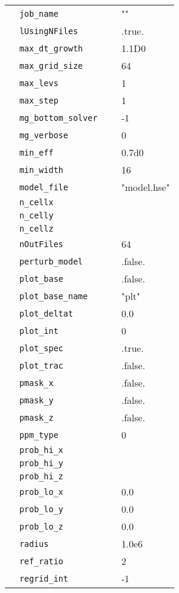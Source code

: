 \begin{center}
\begin{longtable}{|l|p{3.0in}|l|}
\verb=  job_name =  &   & "" \\
\verb=  lUsingNFiles =  &   &  .true.  \\
\verb=  max_dt_growth =  &   &  1.1D0  \\
\verb=  max_grid_size =  &   &  64  \\
\verb=  max_levs =  &   &  1  \\
\verb=  max_step =  &   &  1  \\
\verb=  mg_bottom_solver =  &   &  -1 \\
\verb=  mg_verbose =  &   &  0  \\
\verb=  min_eff =  &   &  0.7d0  \\
\verb=  min_width =  &   &  16  \\
\verb=  model_file =  &   & "model.hse" \\
\verb=  n_cellx =  &   &   \\
\verb=  n_celly =  &   &   \\
\verb=  n_cellz =  &   &   \\
\verb=  nOutFiles =  &   &  64  \\
\verb=  perturb_model =  &   &  .false.  \\
\verb=  plot_base =  &   & .false. \\
\verb=  plot_base_name =  &   & "plt" \\
\verb=  plot_deltat =  &   &  0.0  \\
\verb=  plot_int =  &   &  0  \\
\verb=  plot_spec =  &   &  .true.  \\
\verb=  plot_trac =  &   &  .false.  \\
\verb=  pmask_x =  &   & .false. \\
\verb=  pmask_y =  &   & .false. \\
\verb=  pmask_z =  &   & .false. \\
\verb=  ppm_type =  &   &  0  \\
\verb=  prob_hi_x =  &   &  \\
\verb=  prob_hi_y =  &   &  \\
\verb=  prob_hi_z =  &   &  \\
\verb=  prob_lo_x =  &   &  0.0 \\
\verb=  prob_lo_y =  &   &  0.0 \\
\verb=  prob_lo_z =  &   &  0.0 \\
\verb=  radius =  &   & 1.0e6 \\
\verb=  ref_ratio =  &   &  2  \\
\verb=  regrid_int =  &   &  -1  \\

\end{longtable}
\end{center}
